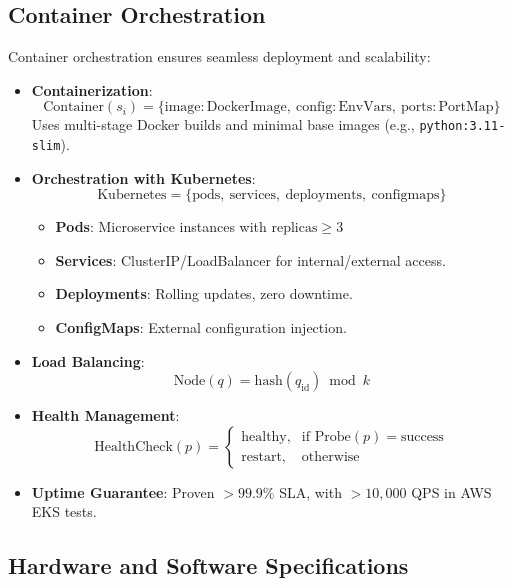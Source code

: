 \documentclass[11pt]{article}
\begin{document}
\subsection{Container Orchestration}
\label{subsec:orchestration}

Container orchestration ensures seamless deployment and scalability:

\begin{itemize}
    \item \textbf{Containerization}:
        \[
        \text{Container}(s_i) = \{ \text{image}: \text{DockerImage},\ \text{config}: \text{EnvVars},\ \text{ports}: \text{PortMap} \}
        \]
        Uses multi-stage Docker builds and minimal base images (e.g., \texttt{python:3.11-slim}).

    \item \textbf{Orchestration with Kubernetes}:
        \[
        \text{Kubernetes} = \{ \text{pods},\ \text{services},\ \text{deployments},\ \text{configmaps} \}
        \]
        \begin{itemize}
            \item \textbf{Pods}: Microservice instances with $ \text{replicas} \geq 3 $
            \item \textbf{Services}: ClusterIP/LoadBalancer for internal/external access.
            \item \textbf{Deployments}: Rolling updates, zero downtime.
            \item \textbf{ConfigMaps}: External configuration injection.
        \end{itemize}

    \item \textbf{Load Balancing}:
        \[
        \text{Node}(q) = \text{hash}(q_{\text{id}}) \bmod k
        \]

    \item \textbf{Health Management}:
        \[
        \text{HealthCheck}(p) = 
        \begin{cases}
        \text{healthy}, & \text{if } \text{Probe}(p) = \text{success} \\
        \text{restart}, & \text{otherwise}
        \end{cases}
        \]

    \item \textbf{Uptime Guarantee}: Proven $ >99.9\% $ SLA, with $ >10{,}000 $ QPS in AWS EKS tests.
\end{itemize}

\subsection{Hardware and Software Specifications}
\label{subsec:hardware_software}
\end{document}
